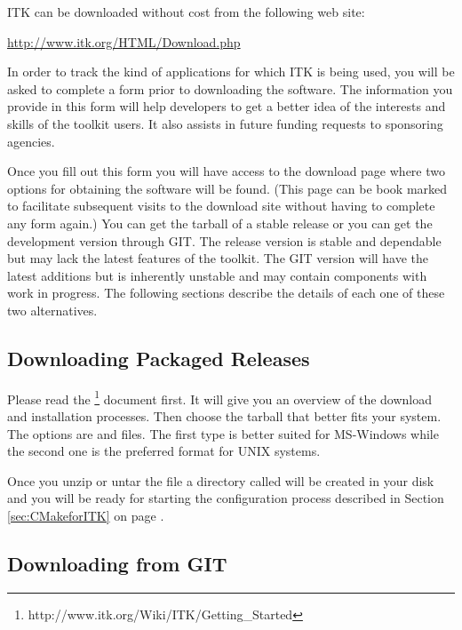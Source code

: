 
ITK can be downloaded without cost from the following web site:
\begin{center} 
  \url{http://www.itk.org/HTML/Download.php}
\end{center}
In order to track the kind of applications for which ITK is being used, you
will be asked to complete a form prior to downloading the software.
The information you provide in this form will help developers to get a better
idea of the interests and skills of the toolkit users. It also assists in 
future funding requests to sponsoring agencies.

Once you fill out this form you will have access to the download page where two
options for obtaining the software will be found. (This page can be
book marked to facilitate subsequent visits to the download site without
having to complete any form again.) You can get the tarball of a stable
release or you can get the development version through GIT.  The release
version is stable and dependable but may lack the latest features of the
toolkit. The GIT version will have the latest additions but is inherently
unstable and may contain components with work in progress.  The following
sections describe the details of each one of these two alternatives.

\subsection{Downloading Packaged Releases}
\label{sec:DownloadingReleases}


Please read the
\footnote{http://www.itk.org/Wiki/ITK/Getting_Started}
document first. It will give you an overview of the download and installation
processes. Then choose the tarball that better fits your system. The options
are  and  files.  The first type is better suited for
MS-Windows while the second one is the preferred format for UNIX systems.

Once you unzip or untar the file a directory called  will be
created in your disk and you will be ready for starting the configuration
process described in Section \ref{sec:CMakeforITK} on page 
\pageref{sec:CMakeforITK}.

\subsection{Downloading from GIT}
\label{sec:DownloadingFromGIT}

